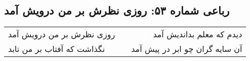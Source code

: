 \begin{center}
\section*{رباعی شماره ۵۳: روزی نظرش بر من درویش آمد}
\label{sec:053}
\begin{longtable}{l p{0.5cm} r}
روزی نظرش بر من درویش آمد
&&
دیدم که معلم بداندیش آمد
\\
نگذاشت که آفتاب بر من تابد
&&
آن سایه گران چو ابر در پیش آمد
\\
\end{longtable}
\end{center}
